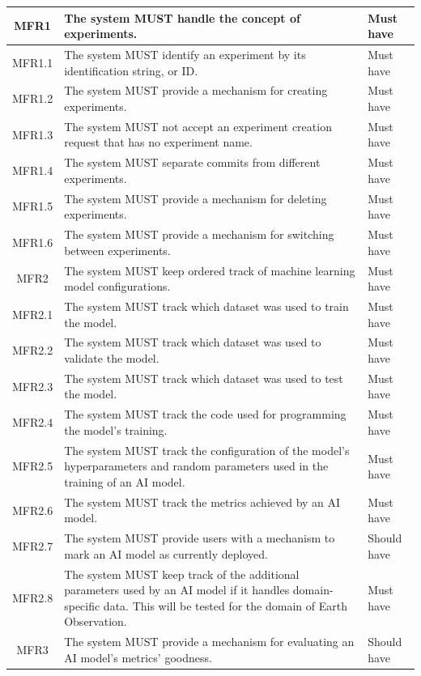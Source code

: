 \begin{longtable}{| c | p{9cm} | p{3cm} |}
    \hline
    MFR1     & The system MUST handle the concept of experiments. & Must have \\ \hline
    MFR1.1   & The system MUST identify an experiment by its identification string, or ID. & Must have \\ \hline
    MFR1.2   & The system MUST provide a mechanism for creating experiments. & Must have \\ \hline
    MFR1.3   & The system MUST not accept an experiment creation request that has no experiment name. & Must have \\ \hline
    MFR1.4   & The system MUST separate commits from different experiments. & Must have \\ \hline
    MFR1.5   & The system MUST provide a mechanism for deleting experiments. & Must have \\ \hline
    MFR1.6   & The system MUST provide a mechanism for switching between experiments. & Must have \\ \hline
    MFR2     & The system MUST keep ordered track of machine learning model configurations. & Must have \\ \hline
    MFR2.1   & The system MUST track which dataset was used to train the model. & Must have \\ \hline
    MFR2.2   & The system MUST track which dataset was used to validate the model. & Must have \\ \hline
    MFR2.3   & The system MUST track which dataset was used to test the model. & Must have \\ \hline
    MFR2.4   & The system MUST track the code used for programming the model's training. & Must have \\ \hline
    MFR2.5   & The system MUST track the configuration of the model's hyperparameters and random parameters used in the training of an AI model. & Must have \\ \hline
    MFR2.6   & The system MUST track the metrics achieved by an AI model. & Must have \\ \hline
    MFR2.7   & The system MUST provide users with a mechanism to mark an AI model as currently deployed. & Should have \\ \hline
    MFR2.8   & The system MUST keep track of the additional parameters used by an AI model if it handles domain-specific data. This will be tested for the domain of Earth Observation. & Must have \\ \hline
    MFR3     & The system MUST provide a mechanism for evaluating an AI model's metrics' goodness. & Should have \\ \hline

\end{longtable}
